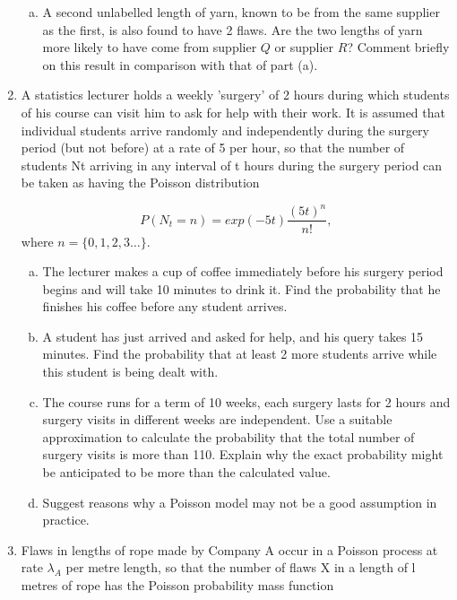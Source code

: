 \documentclass[a4paper,12pt]{article}
\begin{document}
\begin{enumerate}
\begin{enumerate}[(a)]
\item A second unlabelled length of yarn, known to be from the same supplier as the first, is also found to have 2 flaws. Are the two lengths of yarn more likely to have come from supplier $Q$ or supplier $R$? Comment briefly on this result in comparison with that of part (a).
\end{enumerate}

\item A statistics lecturer holds a weekly 'surgery' of 2 hours during which students of his
course can visit him to ask for help with their work. It is assumed that individual
students arrive randomly and independently during the surgery period (but not before)
at a rate of 5 per hour, so that the number of students Nt arriving in any interval of
t hours during the surgery period can be taken as having the Poisson distribution

\[ P(N_t=n) = exp(-5t) \frac{(5t)^n}{n!}, \]
where $n=\{0,1,2,3 \ldots \}$.

\begin{enumerate}[(a)]
\item The lecturer makes a cup of coffee immediately before his surgery period
begins and will take 10 minutes to drink it. Find the probability that he
finishes his coffee before any student arrives.
\item  A student has just arrived and asked for help, and his query takes 15 minutes.
Find the probability that at least 2 more students arrive while this student is
being dealt with.
\item The course runs for a term of 10 weeks, each surgery lasts for 2 hours and
surgery visits in different weeks are independent. Use a suitable approximation
to calculate the probability that the total number of surgery visits is more than
110. Explain why the exact probability might be anticipated to be more than
the calculated value.
\item Suggest reasons why a Poisson model may not be a good assumption in
practice.
\end{enumerate}






\item Flaws in lengths of rope made by Company A occur in a Poisson process at rate $\lambda_A$ per metre length, so that the number of flaws X in a length of l metres of rope has the Poisson probability mass function



\end{enumerate}
\end{document}
